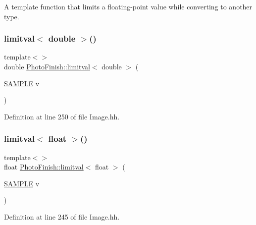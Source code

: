 A template function that limits a floating-\/point value while converting to another type. 

\mbox{\label{namespace_photo_finish_a252538ec5e799456b41654d3f4431c5d}} 
\subsubsection{\texorpdfstring{limitval$<$ double $>$()}{limitval< double >()}}
{\footnotesize\ttfamily template$<$$>$ \\
double \hyperlink{namespace_photo_finish_aa019419c2456e119283e24d6e6fa3cbb}{Photo\+Finish\+::limitval}$<$ double $>$ (\begin{DoxyParamCaption}\item[{\hyperlink{sample_8h_afc597c76b4f04a2da506a240d51d89a0}{S\+A\+M\+P\+LE}}]{v }\end{DoxyParamCaption})\hspace{0.3cm}{\ttfamily [inline]}}



Definition at line 250 of file Image.\+hh.

\mbox{\label{namespace_photo_finish_a56b580dadd8be41410c8722bc908a8fb}} 
\subsubsection{\texorpdfstring{limitval$<$ float $>$()}{limitval< float >()}}
{\footnotesize\ttfamily template$<$$>$ \\
float \hyperlink{namespace_photo_finish_aa019419c2456e119283e24d6e6fa3cbb}{Photo\+Finish\+::limitval}$<$ float $>$ (\begin{DoxyParamCaption}\item[{\hyperlink{sample_8h_afc597c76b4f04a2da506a240d51d89a0}{S\+A\+M\+P\+LE}}]{v }\end{DoxyParamCaption})\hspace{0.3cm}{\ttfamily [inline]}}



Definition at line 245 of file Image.\+hh.

